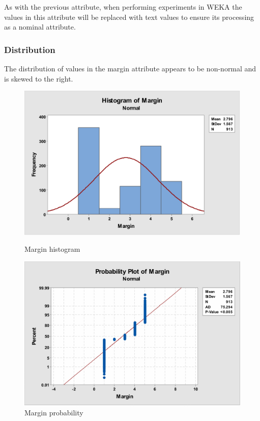 \documentclass[12pt]{article}
\begin{document}
        As with the previous attribute, when performing experiments in WEKA the values in this attribute will be replaced with text values to ensure its processing as a nominal attribute.

      \subsubsection{Distribution}
        The distribution of values in the margin attribute appears to be non-normal and is skewed to the right.

        \begin{figure}[H]
          \centering
          \begin{minipage}[b]{0.45\textwidth}
            \includegraphics[width=\textwidth]{margin-histogram}
            \caption{Margin histogram}
            \label{fig:margin-histogram}
          \end{minipage}
          \hfill
          \begin{minipage}[b]{0.45\textwidth}
            \includegraphics[width=\textwidth]{margin-probability}
            \caption{Margin probability}
            \label{fig:margin-probability}
          \end{minipage}
        \end{figure}
\end{document}
